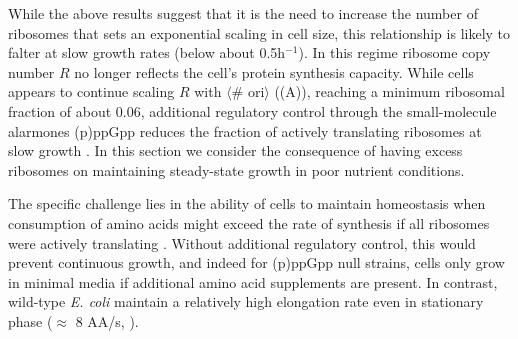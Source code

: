 While the above results suggest that it is the need to increase the number of
ribosomes that sets an exponential scaling in cell size, this relationship is
likely to falter at slow growth rates (below about 0.5h$^{-1}$). In this regime
ribosome copy number $R$ no longer reflects the cell's protein synthesis
capacity. While cells appears to continue scaling $R$ with $\langle$\# ori$\rangle$
((A)), reaching a minimum ribosomal fraction of about
0.06, additional regulatory control through the small-molecule alarmones
(p)ppGpp  reduces the fraction of actively translating ribosomes at slow growth
\citep{dai2016, bosdriesz2015, zhu2019}. In this section we consider the
consequence of having excess ribosomes on maintaining steady-state growth in
poor nutrient conditions.


The specific challenge lies in the ability of cells to maintain homeostasis when
consumption of amino acids might exceed the rate of synthesis
if all ribosomes were actively translating .
Without additional regulatory control, this would prevent continuous growth, and
indeed for (p)ppGpp null strains, cells only grow in minimal media if additional
amino acid supplements are present. In contrast, wild-type \textit{E. coli}
maintain a relatively high elongation rate even in stationary phase
($\approx$ 8 AA/s, \citep{dai2016, dai2018}).


